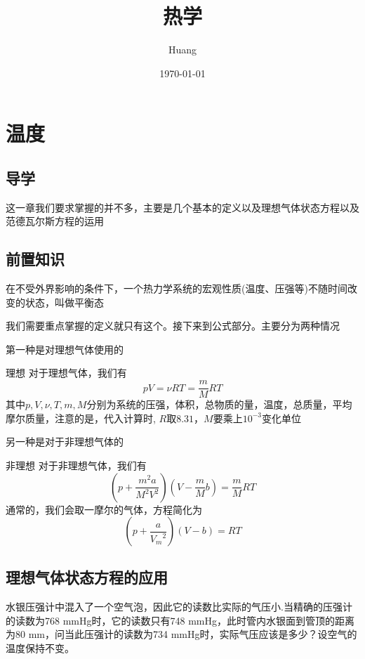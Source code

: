 \documentclass[lang=cn,10pt]{elegantbook}
\title{热学}
\author{ Huang}
\date{\today}
\begin{document}
	
	\maketitle
	\frontmatter
	
	\tableofcontents
	
	\mainmatter
	\chapter{温度}
	\section{导学}
	这一章我们要求掌握的并不多，主要是几个基本的定义以及理想气体状态方程以及范德瓦尔斯方程的运用
	
	\section{前置知识}
	
	\begin{definition}[平衡态]
		在不受外界影响的条件下，一个热力学系统的宏观性质(温度、压强等)不随时间改变的状态，叫做平衡态
	\end{definition}
	
	我们需要重点掌握的定义就只有这个。接下来到公式部分。主要分为两种情况
	
	第一种是对理想气体使用的
	\begin{theorem}[理想气体状态方程]{理想}
		对于理想气体，我们有
		\begin{equation*}
			pV=\nu RT=\frac{m}{M}RT
		\end{equation*}
		其中$p,V,\nu,T,m,M$分别为系统的压强，体积，总物质的量，温度，总质量，平均摩尔质量，注意的是，代入计算时,
		$R\text{取}8.31\text{，}M\text{要乘上}10^{-3}\text{变化单位}
		$
	\end{theorem}
	
		另一种是对于非理想气体的
	\begin{theorem}[范德瓦尔斯方程]{非理想}
		对于非理想气体，我们有
		\begin{equation*}
			\left( p+\frac{m^2a}{M^2V^2} \right) \left( V-\frac{m}{M}b \right) =\frac{m}{M}RT
		\end{equation*}
		通常的，我们会取一摩尔的气体，方程简化为
		\begin{equation*}
			\left( p+\frac{a}{{V_m}^2} \right) \left( V-b \right) =RT
		\end{equation*}
	\end{theorem}
	\section{理想气体状态方程的应用}
	\begin{example}
		水银压强计中混入了一个空气泡，因此它的读数比实际的气压小.当精确的压强计的读数为768 mmHg时，它的读数只有748 mmHg，此时管内水银面到管顶的距离为80 mm，问当此压强计的读数为734 mmHg时，实际气压应该是多少？设空气的温度保持不变。
	\end{example}
	
\end{document}
